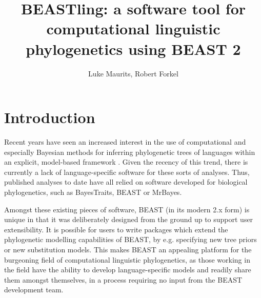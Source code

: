 \documentclass[twocolumn,10pt]{scrartcl}
\begin{document}
\title{BEASTling: a software tool for computational linguistic phylogenetics using BEAST 2}
\author{Luke Maurits, Robert Forkel}
\maketitle


\section{Introduction}

Recent years have seen an increased interest in the use of computational and especially Bayesian methods for inferring phylogenetic trees of languages within an explicit, model-based framework \citep[e.g.,][]{Gray2003,Gray2009,Kitchen2009,Dunn2011a,Lee2011,Bouckaert2012,Bowern2012,Currie2013,Honkola2013,Sicoli2014,Grollemund2015}.  Given the recency of this trend, there is currently a lack of language-specific software for these sorts of analyses.  Thus, published analyses to date have all relied on software developed for biological phylogenetics, such as BayesTraits\cite{Pagel2004}, BEAST\cite{Drummond2012,Bouckaert2014} or MrBayes\cite{Huelsenbeck2001, Ronquist2003}.

Amongst these existing pieces of software, BEAST (in its modern 2.x form) is unique in that it was deliberately designed from the ground up to support user extensibility.  It is possible for users to write packages which extend the phylogenetic modelling capabilities of BEAST, by e.g. specifying new tree priors or new substitution models.  This makes BEAST an appealing platform for the burgeoning field of computational linguistic phylogenetics, as those working in the field have the ability to develop language-specific models and readily share them amongst themselves, in a process requiring no input from the BEAST development team.
\end{document}

